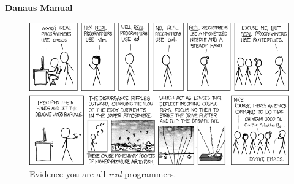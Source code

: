\documentclass{pset}
\begin{document}
\ifx \ATHREE \undefined \else
\newcommand{\TITLEPAGE}{} 
\newcommand{\TOC}{} 
\newcommand{\OVERVIEW}{} 
\newcommand{\COURSEOVERVIEW}{} 
\newcommand{\DANAUSOVERVIEW}{} 
\newcommand{\SIMULATIONBASICS}{} 
\newcommand{\PARKSMAPSTILES}{} 
\newcommand{\BUTTERFLIES}{} 
\newcommand{\DIRECTION}{} 
\newcommand{\MAPS}{} 
\newcommand{\TILETYPES}{} 
\newcommand{\TILESTATE}{} 
\newcommand{\BUTTERFLYAPI}{} 
\newcommand{\VOIDFLY}{} 
\newcommand{\VOIDREFRESHSTATE}{} 
\newcommand{\INTGETMAPWIDTH}{} 
\newcommand{\INTGETMAPHEIGHT}{} 
\newcommand{\LEARNINGRUNNING}{} 
\newcommand{\LEARNING}{} 
\newcommand{\RUNNING}{} 
\newcommand{\CLO}{} 
\newcommand{\ADVICE}{} 
\newcommand{\CREDITS}{}
\fi

\ifx \TITLEPAGE \undefined \else
\clearpage
\vspace*{\fill}
\begin{center}
    \huge\bfseries
    Danaus Manual
\end{center}

\begin{figure}[H]
    \centering
    \includegraphics[width=\textwidth]{img/xkcd.png}
    \caption{Evidence you are all \emph{real} programmers.}
    \label{fig:xkcd}
\end{figure}
\vspace{\fill}
\clearpage
\fi
\end{document}
